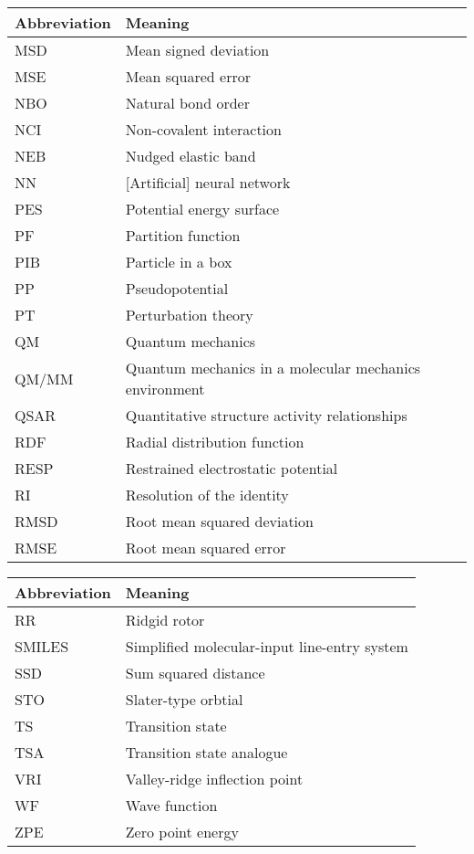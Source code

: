 \documentclass[../main.tex]{subfiles}
\begin{document}
\begin{table}[h!]
\def\arraystretch{2.0}
\begin{tabularx}{\textwidth}{YY}
Abbreviation & Meaning \\
\hline
MSD	&	Mean signed deviation	\\
MSE	&	Mean squared error	\\
NBO	&	Natural bond order	\\
NCI	&	Non-covalent interaction	\\
NEB	&	Nudged elastic band	\\
NN	&	[Artificial] neural network	\\
PES	&	Potential energy surface	\\
PF	&	Partition function	\\
PIB	&	Particle in a box	\\
PP	&	Pseudopotential	\\
PT	&	Perturbation theory	\\
QM	&	Quantum mechanics	\\
QM/MM	&	Quantum mechanics in a molecular mechanics environment	\\
QSAR	&	Quantitative structure activity relationships	\\
RDF	&	Radial distribution function	\\
RESP	&	Restrained electrostatic potential	\\
RI	&	Resolution of the identity	\\
RMSD	&	Root mean squared deviation	\\
RMSE	&	Root mean squared error	\\
\end{tabularx}
\end{table}
\newpage
\begin{table}[h!]
\def\arraystretch{2.0}
\begin{tabularx}{\textwidth}{YY}
Abbreviation & Meaning \\
\hline
RR	&	Ridgid rotor	\\
SMILES	&	Simplified molecular-input line-entry system	\\
SSD	&	Sum squared distance	\\
STO	&	Slater-type orbtial	\\
TS	&	Transition state	\\
TSA	&	Transition state analogue	\\
VRI	&	Valley-ridge inflection point	\\
WF	&	Wave function	\\
ZPE	&	Zero point energy	\\
\end{tabularx}
\end{table}
\clearpage
\end{document}

